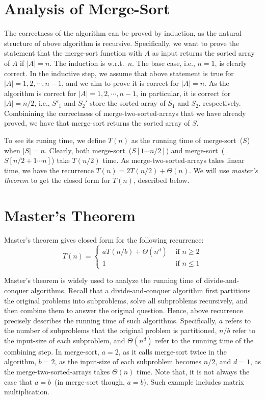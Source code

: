 \section*{Analysis of Merge-Sort}

The correctness of the algorithm can be proved by induction, as the natural structure of above algorithm is recursive.
Specifically, we want to prove the statement that the merge-sort function with $A$ as input returns the sorted array of $A$ if $|A| = n$.
The induction is w.r.t.\ $n$. The base case, i.e., $n = 1$, is clearly correct.
In the inductive step, we assume that above statement is true for $|A| = 1, 2, \cdots, n - 1$, and we aim to prove it is correct for $|A| = n$.
As the algorithm is correct for $|A| = 1, 2, \cdots, n - 1$, in particular, it is correct for $|A| = n/2$, i.e.,
$S'_1$ and $S_2'$ store the sorted array of $S_1$ and $S_2$, respectively.
Combinining the correctness of merge-two-sorted-arrays that we have already proved,
we have that merge-sort returns the sorted array of $S$.

To see its runing time, we define $T(n)$ as the running time of merge-sort~($S$) when $|S| = n$.
Clearly, both merge-sort~($S[1\cdots n/2]$) and
merge-sort~($S[n/2+1\cdots n]$) take $T(n/2)$ time.
As merge-two-sorted-arrays takes linear time, we have the recurrence $T(n) = 2T(n/2) + \Theta(n)$.
We will use \emph{master's theorem} to get the closed form for $T(n)$, described below.

\section*{Master's Theorem}

Master's theorem gives closed form for the following recurrence:
\begin{displaymath}
T(n) = \left\{
\begin{array}{llll}
aT(n/b) + \Theta(n^d)  & \textrm{ if } n \ge 2 \\
1  & \textrm{ if } n \le 1 
\end{array}
\right.
\end{displaymath}

Master's theorem is widely used to analyze the running time of divide-and-conquer algorithms. 
Recall that a divide-and-conquer algorithm
first partitions the original problems into subproblems, solve all subproblems recursively,
and then combine them to answer the original question.
Hence, above recurrence precisely describes the running time of such algorithms.
Specifically, $a$ refers to the number of subproblems that the original problem is partitioned,
$n/b$ refer to the input-size of each subproblem,
and $\Theta(n^d)$ refer to the running time of the combining step.
In merge-sort, $a = 2$, as it calls merge-sort twice in the algorithm,
$b = 2$, as the input-size of each subproblem becomes $n/2$,
and $d = 1$, as the merge-two-sorted-arrays takes $\Theta(n)$ time.
Note that, it is not always the case that $a = b$~(in merge-sort though, $a = b$).
Such example includes matrix multiplication.

